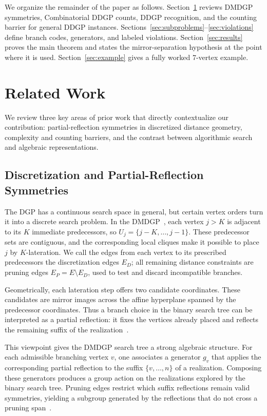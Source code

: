 \documentclass[11pt]{article}
\theoremstyle{plain}
\theoremstyle{definition}
\begin{document}
We organize the remainder of the paper as follows. Section~\ref{sec:related} reviews DMDGP symmetries, Combinatorial DDGP counts, DDGP recognition, and the counting barrier for general DDGP instances. Sections~\ref{sec:subproblems}--\ref{sec:violations} define branch codes, generators, and labeled violations. Section~\ref{sec:results} proves the main theorem and states the mirror-separation hypothesis at the point where it is used. Section~\ref{sec:example} gives a fully worked 7-vertex example.

\section{Related Work}
\label{sec:related}

We review three key areas of prior work that directly contextualize our contribution: partial-reflection symmetries in discretized distance geometry, complexity and counting barriers, and the contrast between algorithmic search and algebraic representations.

\subsection{Discretization and Partial-Reflection Symmetries}
The DGP has a continuous search space in general, but certain vertex orders turn it into a discrete search problem. In the DMDGP~\cite{lavor2012discretizable}, each vertex $j>K$ is adjacent to its $K$ immediate predecessors, so $U_j = \{j-K, \ldots, j-1\}$. These predecessor sets are contiguous, and the corresponding local cliques make it possible to place $j$ by $K$-lateration. We call the edges from each vertex to its prescribed predecessors the discretization edges $E_D$; all remaining distance constraints are pruning edges $E_P=E\setminus E_D$, used to test and discard incompatible branches.

Geometrically, each lateration step offers two candidate coordinates. These candidates are mirror images across the affine hyperplane spanned by the predecessor coordinates. Thus a branch choice in the binary search tree can be interpreted as a partial reflection: it fixes the vertices already placed and reflects the remaining suffix of the realization~\cite{mucherino2012exploiting}.

This viewpoint gives the DMDGP search tree a strong algebraic structure. For each admissible branching vertex $v$, one associates a generator $g_v$ that applies the corresponding partial reflection to the suffix $\{v,\ldots,n\}$ of a realization. Composing these generators produces a group action on the realizations explored by the binary search tree. Pruning edges restrict which suffix reflections remain valid symmetries, yielding a subgroup generated by the reflections that do not cross a pruning span~\cite{mucherino2012exploiting,liberti2013counting}.
\end{document}
